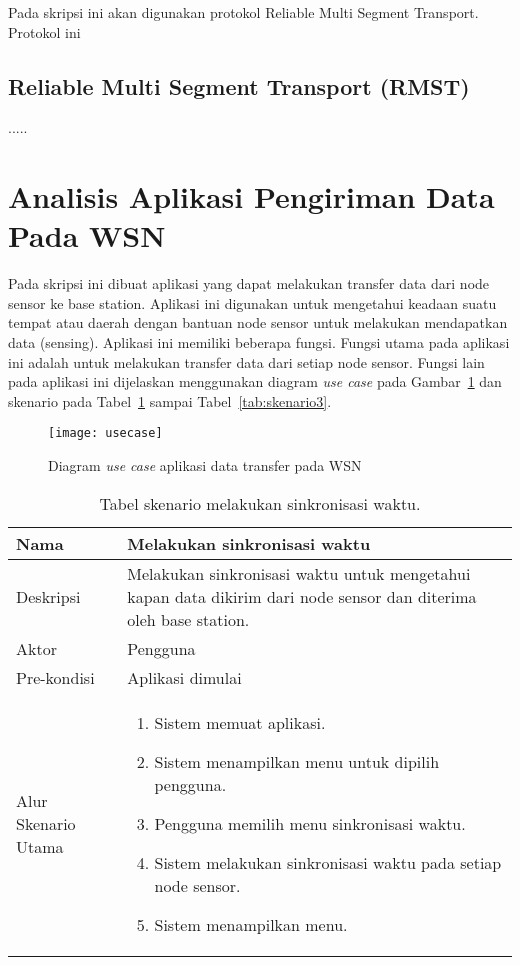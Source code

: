 Pada skripsi ini akan digunakan protokol Reliable Multi Segment Transport. Protokol ini 


\subsection{Reliable Multi Segment Transport (RMST)}
.....

\section{Analisis Aplikasi Pengiriman Data Pada WSN}
Pada skripsi ini dibuat aplikasi yang dapat melakukan transfer data dari node sensor ke base station. Aplikasi ini digunakan untuk mengetahui keadaan suatu tempat atau daerah dengan bantuan node sensor untuk melakukan mendapatkan data (sensing). Aplikasi ini memiliki beberapa fungsi. Fungsi utama pada aplikasi ini adalah untuk melakukan transfer data dari setiap node sensor. Fungsi lain pada aplikasi ini dijelaskan menggunakan diagram \textit{use case} pada Gambar~\ref{fig:usecase} dan skenario pada Tabel~\ref{tab:skenario1} sampai Tabel~\ref{tab:skenario3}.

\begin{figure}[htbp]
	\centering
	\texttt{[image: usecase]}
	\caption{Diagram \textit{use case} aplikasi data transfer pada WSN}
	\label{fig:usecase}
\end{figure}

\begin{table}[htbp]
    \centering
    \begin{tabular}{|p{3cm}|p{10cm}|}
    \hline
        Nama & Melakukan sinkronisasi waktu\\
    \hline
    \hline
        Deskripsi & Melakukan sinkronisasi waktu untuk mengetahui kapan data dikirim dari node sensor dan diterima oleh base station. \\
    \hline
        Aktor & Pengguna \\
    \hline
        Pre-kondisi & Aplikasi dimulai \\
    \hline
        Alur Skenario Utama & 
        \begin{enumerate}
            \item Sistem memuat aplikasi.
            \item Sistem menampilkan menu untuk dipilih pengguna.
            \item Pengguna memilih menu sinkronisasi waktu.
            \item Sistem melakukan sinkronisasi waktu pada setiap node sensor.
            \item Sistem menampilkan menu.
        \end{enumerate}\\
    \hline
    \end{tabular}
    \caption{Tabel skenario melakukan sinkronisasi waktu.}
    \label{tab:skenario1}
\end{table}

